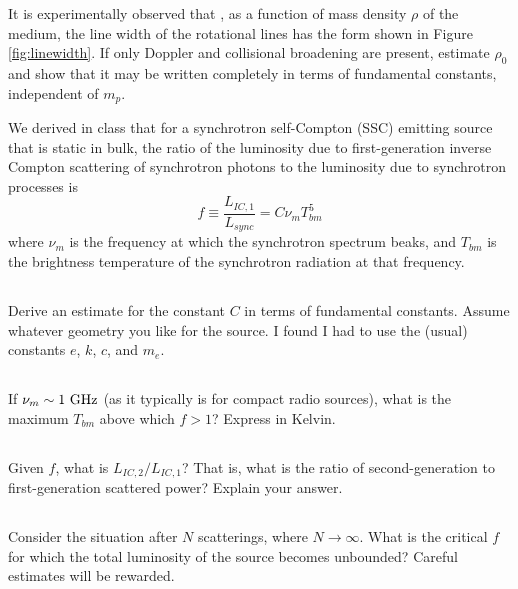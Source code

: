 \documentclass[11pt]{article}
\begin{document}
It is experimentally observed that , as a function of mass density $\rho$ of
the medium, the line width of the rotational lines has the form
shown in Figure \ref{fig:linewidth}.  If only Doppler and collisional broadening
are present, estimate $\rho_0$ and show that it may be written completely in
terms of fundamental constants, independent of $m_p$. 

We derived in class that for a synchrotron self-Compton (SSC) emitting source
that is static in bulk, the ratio of the luminosity due to first-generation
inverse Compton scattering of synchrotron photons to the luminosity due to synchrotron processes is
\begin{equation}
f\equiv\frac{L_{IC,1}}{L_{sync}}=C\nu_mT_{bm}^5
\end{equation}
where $\nu_m$ is the frequency at which the synchrotron spectrum beaks, and $T_{bm}$
is the brightness temperature of the synchrotron radiation at that frequency.

\subsection{}
Derive an estimate for the constant $C$ in terms of fundamental constants.
Assume whatever geometry you like for the source.  I found I had to use the (usual)
constants $e$, $k$, $c$, and $m_e$.

\subsection{}
If $\nu_m\sim1~{\rm GHz}$ (as it typically is for compact radio sources), what is the
maximum $T_{bm}$ above which $f>1$?  Express in Kelvin.

\subsection{}
Given $f$, what is $L_{IC,2}/L_{IC,1}$?  That is, what is the ratio of second-generation
to first-generation scattered power?  Explain your answer.

\subsection{}
Consider the situation after $N$ scatterings, where $N\rightarrow\infty$.  What is the 
critical $f$ for which the total luminosity of the source becomes unbounded?  Careful
estimates will be rewarded.
\end{document}
